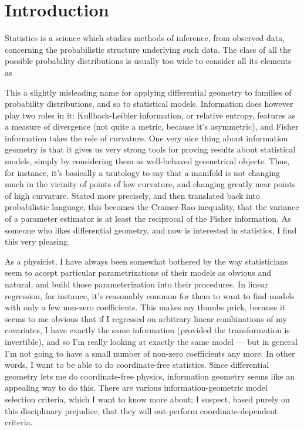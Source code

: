 
\section{Introduction}
Statistics is a science which studies methods of inference, from observed data, concerning the 
probabilistic structure
underlying such data. The class of all the possible probability distributions is usually too wide to consider all its
elements as 

This a slightly misleading name for applying differential geometry to families of probability distributions,
and so to statistical models. Information does however play two roles in it: Kullback-Leibler information, 
or relative entropy, features as a measure of divergence (not quite a metric, because it's asymmetric), 
and Fisher information takes the role of curvature. One very nice thing about information geometry 
is that it gives us very strong tools for proving results about statistical models, simply by 
considering them as well-behaved geometrical objects. Thus, for instance, it's basically a tautology to say
that a manifold is not changing much in the vicinity of points of low curvature, and changing greatly near 
points of high curvature. Stated more precisely, and then translated back into probabilistic language,
this becomes the Cramer-Rao inequality, that the variance of a parameter estimator is at least the reciprocal 
of the Fisher information. As someone who likes differential geometry, and now is 
interested in statistics, I find this very pleasing.

As a physicist, I have always been somewhat bothered by the way statisticians seem to accept 
particular parametrizations of their models as obvious and natural, and build those parameterization 
into their procedures. In linear regression, for instance, it's reasonably common for them to want to find models with only a few non-zero coefficients. This makes my thumbs prick, because it seems to me obvious that if I regressed on arbitrary linear combinations of my covariates, I have exactly the same information (provided the transformation is invertible), and so I'm really looking at exactly the same model --- but in general I'm not going to have a small number of non-zero coefficients any more. In other words, I want to be able to do coordinate-free statistics. Since differential geometry lets me do coordinate-free physics, information geometry seems like an appealing way to do this. There are various information-geometric model selection criteria, which I want to know more about; I suspect, based purely on 
this disciplinary prejudice, that they will out-perform coordinate-dependent criteria.

